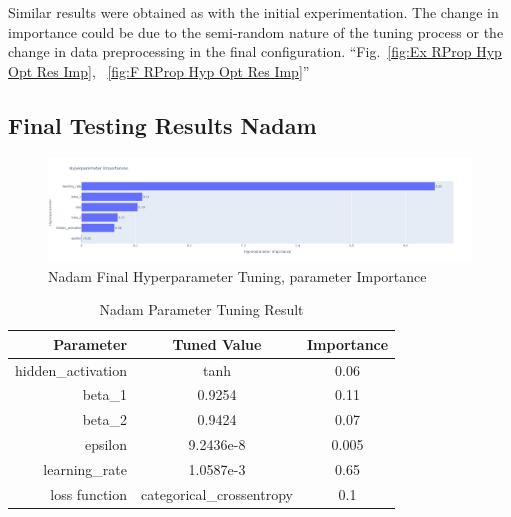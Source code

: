 \documentclass[conference]{IEEEtran}
\begin{document}
\FloatBarrier

Similar results were obtained as with the initial experimentation. The change in importance could be due to the semi-random nature of the tuning process or the change in data preprocessing in the final configuration. ``Fig.~\ref{fig:Ex RProp Hyp Opt Res Imp}, ~\ref{fig:F RProp Hyp Opt Res Imp}''

\subsection{Final Testing Results Nadam}

\begin{figure}[htbp]
\centerline{\includegraphics[width=1\columnwidth]{F Nadam Hyp Opt Res Imp.png}}
\caption{Nadam Final Hyperparameter Tuning, parameter Importance}
\label{fig:F Nadam Hyp Opt Res Imp}
\end{figure}

\FloatBarrier

\begin{table}[htbp]
    \centering
    \begin{tabular}{|r|c|c|}\hline
 Parameter& Tuned Value&Importance\\\hline
        \hline
        hidden\_activation& tanh&0.06\\ \hline
        beta\_1& 0.9254&0.11\\ \hline
        beta\_2& 0.9424&0.07\\ \hline
        epsilon& 9.2436e-8&0.005\\ \hline
         learning\_rate& 1.0587e-3&0.65\\ \hline
        loss function & categorical\_crossentropy&0.1\\\hline
    \end{tabular}
    \caption{Nadam Parameter Tuning Result}
    \label{tab:NadamFinalParams}
\end{table}

\FloatBarrier
\end{document}
